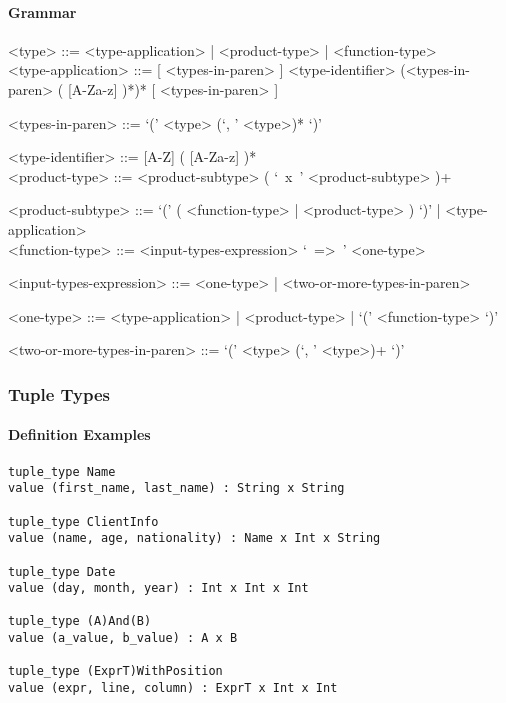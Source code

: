 \documentclass{article}
\begin{document}
\paragraph{Grammar}
\begin{grammar}
<type> ::= <type-application> | <product-type> | <function-type> \\

<type-application> ::=
[ <types-in-paren> ] <type-identifier> (<types-in-paren> ( [A-Za-z] )*)* [ <types-in-paren> ] 

<types-in-paren> ::= `(' <type> (`, ' <type>)* `)'

<type-identifier> ::= [A-Z] ( [A-Za-z] )* \\ 
 
<product-type> ::= <product-subtype> ( `\ x\ ' <product-subtype> )+

<product-subtype> ::=
`(' ( <function-type> | <product-type> ) `)' | <type-application> \\

<function-type> ::= <input-types-expression> `\ =>\ ' <one-type>

<input-types-expression> ::= <one-type> | <two-or-more-types-in-paren>

<one-type> ::= <type-application> | <product-type> | `(' <function-type> `)'

<two-or-more-types-in-paren> ::=  `(' <type> (`, ' <type>)+ `)'
\end{grammar}

\subsubsection{Tuple Types}
\label{subsec:tupts}

\paragraph{Definition Examples}

\begin{verbatim}
tuple_type Name
value (first_name, last_name) : String x String

tuple_type ClientInfo
value (name, age, nationality) : Name x Int x String

tuple_type Date
value (day, month, year) : Int x Int x Int

tuple_type (A)And(B)
value (a_value, b_value) : A x B

tuple_type (ExprT)WithPosition
value (expr, line, column) : ExprT x Int x Int
\end{verbatim}
\end{document}
